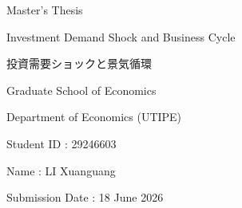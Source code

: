 \documentclass[12pt]{article}
\begin{document}
\begin{center}

\vspace*{2.5cm}

{\Large Master's Thesis}\par

\vspace{2.5cm}

{\LARGE Investment Demand Shock and Business Cycle}\par

\vspace{1.0cm}

{\large 投資需要ショックと景気循環}\par

\vfill

{\large
Graduate School of Economics\par
\vspace{0.5cm}
Department of Economics (UTIPE)\par
\vspace{0.5cm}
Student ID : 29246603\par          %
\vspace{0.5cm}
Name : LI Xuanguang\par           %
\vspace{0.5cm}
Submission Date : 18 June 2026\par %
}

\vspace{2.5cm}

\end{center}
\end{document}
